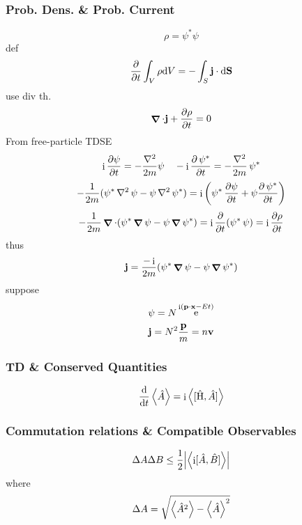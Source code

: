 \documentclass[a4paper]{article}
\DeclareMathOperator{\e}{\mathrm{e}}
\DeclareMathOperator{\I}{\mathrm{i}}
\DeclareMathOperator{\na}{\bm{\nabla}}
\DeclareMathOperator{\nna}{\nabla^2}
\DeclareMathOperator{\psis}{\psi^\ast}
\DeclareMathOperator{\hH}{\hat{H}}
\numberwithin{equation}{section}
\begin{document}
\subsubsection{Prob. Dens. \& Prob. Current}
\begin{equation}\label{key}
\rho = \psi^*\psi
\end{equation}
def
\begin{equation}\label{key}
\pdv{t}\int_V \rho\dd V = -\int_S \vb{j}\cdot\dd\vb{S}
\end{equation}
use div th.
\begin{equation}\label{key}
\na \cdot \vb{j} + \pdv{\rho}{t} = 0
\end{equation}
From free-particle TDSE
\begin{equation}\label{key}
\I\pdv{\psi}{t} = -\dfrac{\nabla^2}{2m}\psi \quad
-\I\pdv{\psis}{t} = -\dfrac{\nabla^2}{2m}\psis
\end{equation}
\begin{equation}\label{key}
-\dfrac{1}{2m}(\psis\nna\psi - \psi\nna\psis) = \I\qty(\psis\pdv{\psi}{t} + \psi\pdv{\psis}{t})
\end{equation}
\begin{equation}\label{key}
-\dfrac{1}{2m}\na\cdot(\psis\na\psi - \psi\na\psis) = \I\pdv{t}(\psis\psi) = \I\pdv{\rho}{t}
\end{equation}
thus
\begin{equation}\label{key}
\vb{j} = \dfrac{-\I}{2m}(\psis\na\psi - \psi\na\psis)
\end{equation}
suppose
\begin{equation}\label{key}
\psi = N\e^{\I(\vb{p}\cdot\vb{x} - Et)}
\end{equation}
\begin{equation}\label{key}
\vb{j} = N^2\dfrac{\vb{p}}{m} = n\vb{v}
\end{equation}

\subsubsection{TD \& Conserved Quantities}
\begin{equation}\label{key}
\dv{t}\ev{\hat{A}} = \I\ev{[\hH,\hat{A}]}
\end{equation}

\subsubsection{Commutation relations \& Compatible Observables}
\begin{equation}\label{key}
\Delta A\Delta B \leq \dfrac{1}{2}\abs{\ev{\I[\hat{A},\hat{B}]}}
\end{equation}
where
\begin{equation}\label{key}
\Delta A = \sqrt{\ev{\hat{A}^2} - \ev{\hat{A}}^2}
\end{equation}
\end{document}
